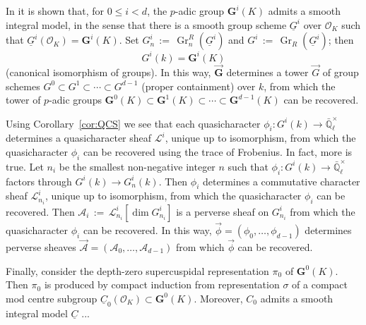 \documentclass[10pt]{amsart}
\theoremstyle{plain}
\theoremstyle{definition}
\newcommand{\EE}{\mathbb{\bar Q}_\ell}
\newcommand{\OK}{\mathcal{O}_K}
\newcommand{\Fq}{k}
\newcommand{\EEx}{\EE^\times}
\newcommand{\G}{\textbf{G}}
\DeclareMathOperator{\Gr}{Gr}
\newcommand{\ceq}{{\, :=\, }}
\newcommand{\cs}[1]{{\mathcal{#1}}}
\begin{document}

In \cite{yu:03a} it is shown that, for $0 \leq i < d$, the $p$-adic group $\G^i(K)$ admits a smooth integral model, in the sense that there is  a smooth group scheme $\underline{G}^i$ over $\OK$ such that $\underline{G}^i(\OK) = \G^i(K)$.
Set $G^i_n \ceq \Gr^R_n(\underline{G}^i)$ and $G^i \ceq \Gr_R(\underline{G}^i)$; 
then \[G^i(\Fq) = \G^i(K)\] (canonical isomorphism of groups).
In this way, $\vec{\G}$ determines a tower $\vec{G}$ of group schemes $G^0 \subset G^1 \subset \cdots  \subset G^{d-1}$ (proper containment) over $\Fq$, from which the tower of $p$-adic groups
$\G^0(K) \subset \G^1(K) \subset \cdots  \subset \G^{d-1}(K)$ can be recovered.

Using Corollary~\ref{cor:QCS}  we see that each quasicharacter $\phi_i : G^i(\Fq) \to \EEx$ determines a quasicharacter sheaf $\cs{L}^i$, unique up to isomorphism, from which the quasicharacter $\phi_i$ can be recovered using the trace of Frobenius. 
In fact, more is true. Let $n_i$ be the smallest non-negative integer $n$ such that $\phi_i : G^i(\Fq) \to \EEx$ factors through $G^i(\Fq) \to G^i_n(\Fq)$.
Then $\phi_i$ determines a commutative character sheaf $\cs{L}_{n_i}^i$, unique up to isomorphism, from which the quasicharacter $\phi_i$ can be recovered.
Then $\cs{A}_i\ceq \cs{L}_{n_i}^i[\dim G_{n_i}^i]$ is a perverse sheaf on $G_{n_i}^i$ from which the quasicharacter $\phi_i$ can be recovered.
In this way,  $\vec{\phi} = (\phi_0, \ldots , \phi_{d-1})$ determines perverse sheaves $\vec{\cs{A}} = (\cs{A}_0, \ldots , \cs{A}_{d-1})$ from which $\vec{\phi}$ can be recovered. 

Finally, consider the depth-zero supercuspidal representation $\pi_0$ of $\G^0(K)$.
Then $\pi_0$ is produced by compact induction from representation $\sigma$ of a compact mod centre subgroup $\underline{C}_0(\OK) \subset \G^0(K)$. Moreover, $C_0$ admits a smooth integral model $\underline{C}$ ...


\fi


\end{document}

